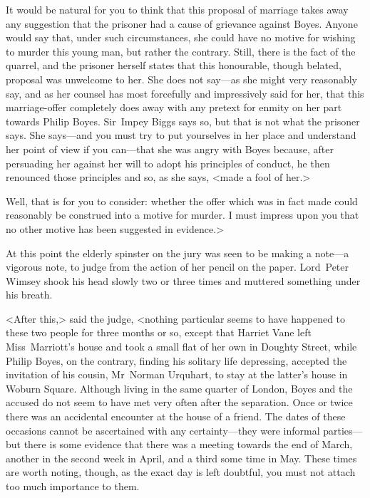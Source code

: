 It would be natural for you to think that this proposal of marriage takes away any suggestion that the prisoner had a cause of grievance against Boyes. Anyone would say that, under such circumstances, she could have no motive for wishing to murder this young man, but rather the contrary. Still, there is the fact of the quarrel, and the prisoner herself states that this honourable, though belated, proposal was unwelcome to her. She does not say—as she might very reasonably say, and as her counsel has most forcefully and impressively said for her, that this marriage-offer completely does away with any pretext for enmity on her part towards Philip Boyes. Sir~Impey Biggs says so, but that is not what the prisoner says. She says—and you must try to put yourselves in her place and understand her point of view if you can—that she was angry with Boyes because, after persuading her against her will to adopt his principles of conduct, he then renounced those principles and so, as she says, <made a fool of her.>

Well, that is for you to consider: whether the offer which was in fact made could reasonably be construed into a motive for murder. I must impress upon you that no other motive has been suggested in evidence.>

At this point the elderly spinster on the jury was seen to be making a note—a vigorous note, to judge from the action of her pencil on the paper. Lord~Peter Wimsey shook his head slowly two or three times and muttered something under his breath.

<After this,> said the judge, <nothing particular seems to have happened to these two people for three months or so, except that Harriet Vane left Miss~Marriott's house and took a small flat of her own in Doughty Street, while Philip Boyes, on the contrary, finding his solitary life depressing, accepted the invitation of his cousin, Mr~Norman Urquhart, to stay at the latter's house in Woburn Square. Although living in the same quarter of London, Boyes and the accused do not seem to have met very often after the separation. Once or twice there was an accidental encounter at the house of a friend. The dates of these occasions cannot be ascertained with any certainty—they were informal parties—but there is some evidence that there was a meeting towards the end of March, another in the second week in April, and a third some time in May. These times are worth noting, though, as the exact day is left doubtful, you must not attach too much importance to them.

